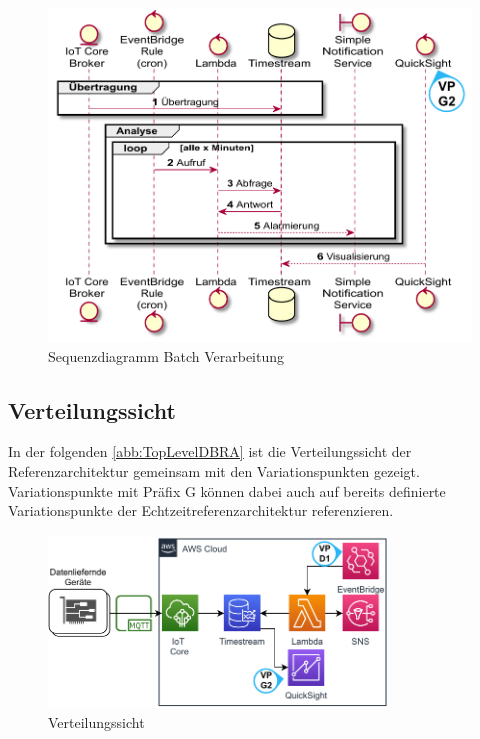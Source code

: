 \begin{figure}[H]
\centering
\includegraphics[height=0.4\textheight]{graphics/batch-ra.pdf}
\caption{Sequenzdiagramm Batch Verarbeitung}
\label{abb:SequenceBatchRA}
\end{figure}



\subsection{Verteilungssicht}\label{subsection:Verteilungssich-B}
In der folgenden \autoref{abb:TopLevelDBRA} ist die Verteilungssicht der Referenzarchitektur gemeinsam mit den Variationspunkten gezeigt. Variationspunkte mit Präfix G können dabei auch auf bereits definierte Variationspunkte der Echtzeitreferenzarchitektur referenzieren.
\begin{figure}[H]
\centering
\includegraphics[width=0.8\textwidth]{graphics/DB-RA-Overview.pdf}
\caption{Verteilungssicht}
\label{abb:TopLevelDBRA}
\end{figure}

